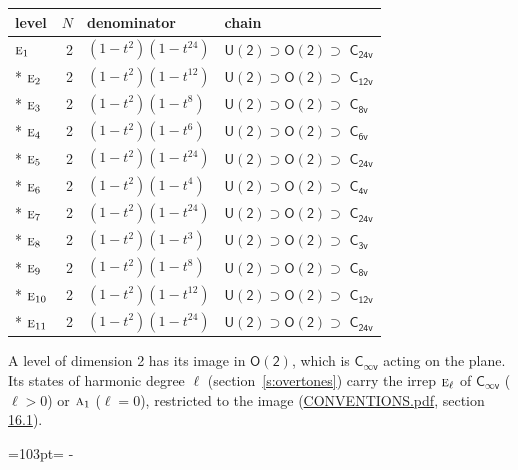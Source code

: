 \documentclass[10pt,a4paper]{article}
\newcommand{\needspace}[1]{\par\penalty-100\begingroup\dimen0=#1\relax\dimen2=\pagegoal
  \advance\dimen2-\pagetotal\ifdim\dimen0>\dimen2\relax\ifdim\dimen2>0pt\vfil\break\fi\fi
  \endgroup}
\numberwithin{equation}{section}
\newcommand{\grp}[1]{\mathsf{#1}}
\newcommand{\irr}[1]{\text{\normalfont\scshape #1}}
\begin{document}
{\small\begin{longtable}{@{}lrll@{}}\toprule
level & $N$ & denominator & chain\\\midrule\endhead
\bottomrule\endfoot\endlastfoot
$\irr{e}_{1}$ & 2 & $(1-t^{2})(1-t^{24})$ & $\grp{U(2)} \supset \grp{O(2)} \supset$ $\grp{C_{24v}}$\\*
$\irr{e}_{2}$ & 2 & $(1-t^{2})(1-t^{12})$ & $\grp{U(2)} \supset \grp{O(2)} \supset$ \href{C12v.pdf}{$\grp{C_{12v}}$}\\*
$\irr{e}_{3}$ & 2 & $(1-t^{2})(1-t^{8})$ & $\grp{U(2)} \supset \grp{O(2)} \supset$ \href{C8v.pdf}{$\grp{C_{8v}}$}\\*
$\irr{e}_{4}$ & 2 & $(1-t^{2})(1-t^{6})$ & $\grp{U(2)} \supset \grp{O(2)} \supset$ \href{C6v.pdf}{$\grp{C_{6v}}$}\\*
$\irr{e}_{5}$ & 2 & $(1-t^{2})(1-t^{24})$ & $\grp{U(2)} \supset \grp{O(2)} \supset$ $\grp{C_{24v}}$\\*
$\irr{e}_{6}$ & 2 & $(1-t^{2})(1-t^{4})$ & $\grp{U(2)} \supset \grp{O(2)} \supset$ \href{C4v.pdf}{$\grp{C_{4v}}$}\\*
$\irr{e}_{7}$ & 2 & $(1-t^{2})(1-t^{24})$ & $\grp{U(2)} \supset \grp{O(2)} \supset$ $\grp{C_{24v}}$\\*
$\irr{e}_{8}$ & 2 & $(1-t^{2})(1-t^{3})$ & $\grp{U(2)} \supset \grp{O(2)} \supset$ \href{C3v.pdf}{$\grp{C_{3v}}$}\\*
$\irr{e}_{9}$ & 2 & $(1-t^{2})(1-t^{8})$ & $\grp{U(2)} \supset \grp{O(2)} \supset$ \href{C8v.pdf}{$\grp{C_{8v}}$}\\*
$\irr{e}_{10}$ & 2 & $(1-t^{2})(1-t^{12})$ & $\grp{U(2)} \supset \grp{O(2)} \supset$ \href{C12v.pdf}{$\grp{C_{12v}}$}\\*
$\irr{e}_{11}$ & 2 & $(1-t^{2})(1-t^{24})$ & $\grp{U(2)} \supset \grp{O(2)} \supset$ $\grp{C_{24v}}$\\
\bottomrule\end{longtable}}
A level of dimension 2 has its image in $\grp{O(2)}$, which is \href{Cinfv.pdf}{$\grp{C_{\infty v}}$} acting on the plane. \label{n:index.harmonic.degree}Its states of harmonic degree $\ell$ (section~\ref{s:overtones}) carry the irrep $\irr{e}_{\ell}$ of \href{Cinfv.pdf}{$\grp{C_{\infty v}}$} ($\ell > 0$) or $\irr{a}_{1}$ ($\ell = 0$), restricted to the image (\href{../../CONVENTIONS.pdf}{CONVENTIONS.pdf}, section \href{../../CONVENTIONS.pdf\#conv.16.1}{16.1}).
\needspace{103pt}
\end{document}
